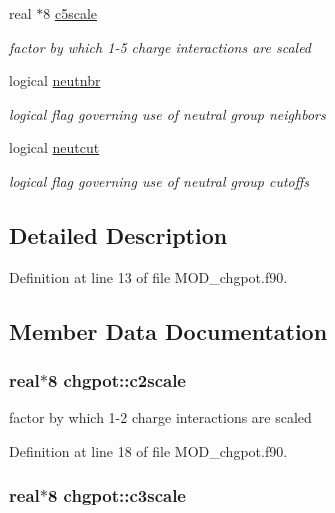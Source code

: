 \begin{DoxyCompactItemize}
real $\ast$8 \hyperlink{classchgpot_a7555f2c48e0d6325ffbc427a49cf1676}{c5scale}
\begin{DoxyCompactList}\small\item\em factor by which 1-\/5 charge interactions are scaled \end{DoxyCompactList}\item 
logical \hyperlink{classchgpot_aaef3345c088c026e3d4f3d94f8e496a1}{neutnbr}
\begin{DoxyCompactList}\small\item\em logical flag governing use of neutral group neighbors \end{DoxyCompactList}\item 
logical \hyperlink{classchgpot_aef4979f868b0e9e09f157aea1765afd6}{neutcut}
\begin{DoxyCompactList}\small\item\em logical flag governing use of neutral group cutoffs \end{DoxyCompactList}\end{DoxyCompactItemize}


\subsection{Detailed Description}


Definition at line 13 of file M\-O\-D\-\_\-chgpot.\-f90.



\subsection{Member Data Documentation}
\hypertarget{classchgpot_a6b7ceb761788269dabbaed681a4eab0c}{
\subsubsection[{c2scale}]{\setlength{\rightskip}{0pt plus 5cm}real$\ast$8 chgpot\-::c2scale}}\label{classchgpot_a6b7ceb761788269dabbaed681a4eab0c}


factor by which 1-\/2 charge interactions are scaled 



Definition at line 18 of file M\-O\-D\-\_\-chgpot.\-f90.

\hypertarget{classchgpot_a105e63b84493a50e9b7de53bd826eeb7}{
\subsubsection[{c3scale}]{\setlength{\rightskip}{0pt plus 5cm}real$\ast$8 chgpot\-::c3scale}}\label{classchgpot_a105e63b84493a50e9b7de53bd826eeb7}


